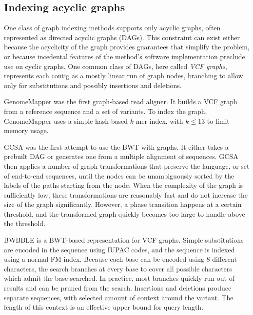 \subsection{Indexing acyclic graphs}

One class of graph indexing methods supports only acyclic graphs, often represented as directed acyclic graphs (DAGs).
This constraint can exist either because the acyclicity of the graph provides guarantees that simplify the problem, or because incedental features of the method's software implementation preclude use on cyclic graphs.
One common class of DAGs, here called \emph{VCF graphs}, represents each contig as a mostly linear run of graph nodes, branching to allow only for substitutions and possibly insertions and deletions.

GenomeMapper \cite{Schneeberger_2009} was the first graph-based read aligner.
It builds a VCF graph from a reference sequence and a set of variants.
To index the graph, GenomeMapper uses a simple hash-based $k$-mer index, with $k \le 13$ to limit memory usage.

GCSA \cite{Siren_2014} was the first attempt to use the BWT with graphs.
It either takes a prebuilt DAG or generates one from a multiple alignment of sequences.
GCSA then applies a number of graph transformations that preserve the language, or set of end-to-end sequences, until the nodes can be unambiguously sorted by the labels of the paths starting from the node.
When the complexity of the graph is sufficiently low, these transformations are reasonably fast and do not increase the size of the graph significantly.
However, a phase transition happens at a certain threshold, and the transformed graph quickly becomes too large to handle above the threshold.

BWBBLE \cite{Huang_2013} is a BWT-based representation for VCF graphs.
Simple substitutions are encoded in the sequence using IUPAC codes, and the sequence is indexed using a normal FM-index.
Because each base can be encoded using 8 different characters, the search branches at every base to cover all possible characters which admit the base searched.
In practice, most branches quickly run out of results and can be pruned from the search.
Insertions and deletions produce separate sequences, with selected amount of context around the variant.
The length of this context is an effective upper bound for query length.

